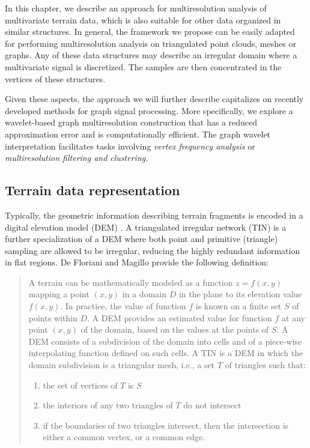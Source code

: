 \documentclass[graybox]{svmult}
\begin{document}
	In this chapter, we describe an approach for multiresolution analysis of multivariate terrain data, which is also suitable for other data organized in similar structures. In general, the framework we propose can be easily adapted for performing multiresolution analysis on triangulated point clouds, meshes or graphs. Any of these data structures may describe an irregular domain where a multivariate signal is discretized. The samples are then concentrated in the vertices of these structures.
	
	Given these aspects, the approach we will further describe capitalizes on recently developed methods for graph signal processing. More specifically, we explore a wavelet-based graph multiresolution construction that has a reduced approximation error and is computationally efficient. The graph wavelet interpretation facilitates tasks involving \emph{vertex frequency analysis} or \emph{multiresolution filtering and clustering}.
	
	
	\subsection{Terrain data representation}
	Typically, the geometric information describing terrain fragments is encoded in a
	digital elevation model (DEM) \cite{vanKreveld1997}. A triangulated irregular network (TIN) is a further
	specialization of a DEM where both point and primitive (triangle) sampling are allowed to be irregular, reducing the highly redundant information in flat regions.
	De Floriani and Magillo \cite{Floriani2016} provide the following definition:
	
	\begin{quotation}
		A terrain can be mathematically modeled as a function $z = f (x, y)$ mapping a point $(x, y)$ in a domain $D$ in the plane to its elevation value $f (x, y)$.
		In practice, the value of function $f$ is known on a finite set $S$ of points within $D$. 
		A DEM provides an estimated value for function $f$ at any point $(x, y)$ of the domain, based on the values at the points of $S$. 
		A DEM consists of a subdivision of the domain into cells and of a piece-wise interpolating function defined on such cells.
		A TIN is a DEM in which the domain subdivision is a triangular mesh, i.e., a set $T$ of triangles such that: 
		\begin{enumerate}
			\item the set of vertices of $T$ is $S$
			\item the interiors of any two triangles of $T$ do not intersect
			\item if the boundaries of two triangles intersect, then the intersection is either a common vertex, or a common edge.
		\end{enumerate}
	\end{quotation}
	
\end{document}
